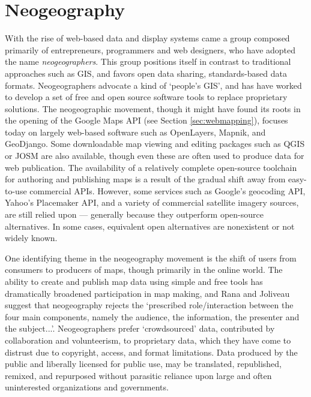 \documentclass[11pt,oneside,notitlepage]{report}
\begin{document}
\section{Neogeography}
\label{sec:neogeography}

With the rise of web-based data and display systems came a group composed primarily of entrepreneurs, programmers and web designers, who have adopted the name \emph{neogeographers}. This group positions itself in contrast to traditional approaches such as GIS, and favors open data sharing, standards-based data formats. Neogeographers advocate a kind of `people's GIS', and has have worked to develop a set of free and open source software tools to replace proprietary solutions. The neogeographic movement, though it might have found its roots in the opening of the Google Maps API (see Section \ref{sec:webmapping}), focuses today on largely web-based software such as OpenLayers, Mapnik, and GeoDjango. Some downloadable map viewing and editing packages such as QGIS or JOSM are also available, though even these are often used to produce data for web publication. The availability of a relatively complete open-source toolchain for authoring and publishing maps is a result of the gradual shift away from easy-to-use commercial APIs. \cite{rana2009neogeography} However, some services such as Google's geocoding API, Yahoo's Placemaker API, and a variety of commercial satellite imagery sources, are still relied upon --- generally because they outperform open-source alternatives. In some cases, equivalent open alternatives are nonexistent or not widely known.

One identifying theme in the neogeography movement is the shift of users from consumers to producers of maps, though primarily in the online world. \cite{oconnor2008maps} The ability to create and publish map data using simple and free tools has dramatically broadened participation in map making, and Rana and Joliveau suggest that neogeography rejects the `prescribed role/interaction between the four main components, namely the audience, the information, the presenter and the subject...'. \cite{rana2009neogeography} Neogeographers prefer `crowdsourced' data, contributed by collaboration and volunteerism, to proprietary data, which they have come to distrust due to copyright, access, and format limitations. Data produced by the public and liberally licensed for public use, may be translated, republished, remixed, and repurposed without parasitic reliance upon large and often uninterested organizations and governments. 
\end{document}
